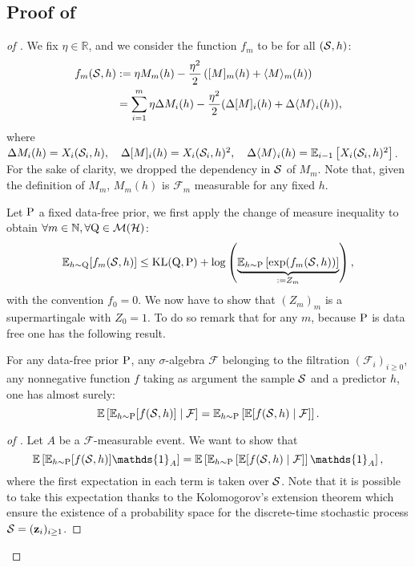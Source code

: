 \subsection{Proof of }
\label{sec: proof_main_thm}

\begin{proof}[of ]
We fix $\eta\in\mathbb{R}$, and we consider the function $f_m$ to be for all $(\S,h)$:
\begin{align*}
f_m(\S,h) & := \eta M_m(h) - \frac{\eta^2}{2} \left( [M]_m(h) + \langle M \rangle_m(h)   \right)\\
& = \sum_{i=1}^m \eta\Delta M_i(h)  - \frac{\eta^2}{2}(\Delta[M]_i(h) + \Delta \langle M\rangle_i(h)),
\end{align*}
where  $\Delta M_{i}(h)=X_i(\S_i,h), \quad\Delta[M]_{i}(h)=X_i(\S_i,h)^{2}, \quad\Delta\langle M\rangle_{i}(h)=\mathbb{E}_{i-1}\left[X_{i}(\S_i,h)^{2}\right]$.
For the sake of clarity, we dropped the dependency in $\S$ of $M_m$. Note that, given the definition of $M_m$, $M_m(h)$ is $\mathcal{F}_{m}$ measurable for any fixed $h$.

Let $\P$ a fixed data-free prior, we first apply the change of measure inequality to obtain $\forall m\in\mathbb{N},\forall \Q\in \mathcal{M}(\mathcal{H})$:
\[  \mathbb{E}_{h\sim \Q}[f_m(\S,h)] \leq \operatorname{KL}(\Q,\P) + \log\left(\underbrace{\mathbb{E}_{h\sim \P} \left[ \exp (f_m(\S,h))   \right] }_{:= Z_m} \right),   \]
with the convention $f_0= 0$.
We now have to show that $(Z_m)_m$ is a supermartingale with $Z_0=1$. To do so remark that for any $m$, because $\P$ is data free one has the following result.
\begin{lemma}
\label{l: cond_fubini}
For any data-free prior $\P$, any $\sigma$-algebra $\mathcal{F}$ belonging to the filtration $(\mathcal{F}_i)_{i\geq 0}$, any nonnegative function  $f$ taking as argument the sample $\S$ and a predictor $h$, one has almost surely: $$\mathbb{E}\left[\mathbb{E}_{h\sim \P}[f(\S,h)] \mid \mathcal{F}\right]  =  \mathbb{E}_{h\sim \P}\left[\mathbb{E}[f(\S,h) \mid \mathcal{F}] \right].$$
\end{lemma}
\begin{proof}[of ]
Let $A$ be a $\mathcal{F}$-measurable event. We want to show that
\[ \mathbb{E}\left[\mathbb{E}_{h\sim \P} [f(\S,h)]\mathds{1}_A \right] = \mathbb{E}\left[\mathbb{E}_{h\sim \P} \left[ \mathbb{E}[f(\S,h)\mid \mathcal{F}] \right] \mathds{1}_A \right], \]
where the first expectation in each term is taken over $\S$. Note that it is possible to take this expectation thanks to the Kolomogorov's extension theorem \citep[see \emph{e.g.}][Thm 2.4.4]{tao2011introduction} which ensure the existence of a probability space for the discrete-time stochastic process $\S=(\z_i)_{i\geq 1}$.


\end{proof}
\end{proof}
